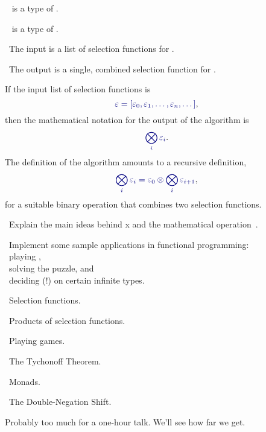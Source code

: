 \documentclass%
[%
Screen4to3,
]{foils}
\begin{document}
\vfill

~ is a type of .

~ is a type of .

~The input is a list of selection functions for .

  
~The output is a single, combined selection function for \darkblue{$[\mathtt{x}]$}.



If the
input list of selection functions is
\[
\darkblue{\varepsilon = [\varepsilon_0,\varepsilon_1,\dots,\varepsilon_n,\dots]},
\]
then the mathematical notation for the output of the algorithm is 
\[
\darkblue{\bigotimes_i \varepsilon_i}.
\]
The definition of the algorithm amounts to a recursive definition,
\[
\darkblue{\bigotimes_i \varepsilon_i = \varepsilon_0 \otimes \bigotimes_i
\varepsilon_{i+1}},
\]
for a suitable binary operation \darkblue{$\otimes$} that combines two selection
functions. 


\vfill

~Explain the main ideas behind x and
the mathematical operation~\darkblue{$\bigotimes$}.

\vfill

~Implement some sample applications in functional
programming:
\\[2ex] \qquad{}~playing ,
\\[2ex] \qquad{}~solving the  puzzle, and 
\\[2ex] \qquad{}~deciding  (!)
on certain infinite types.


~Selection functions. 

~Products of selection functions. 

~Playing games. 

~The Tychonoff Theorem. 

~Monads. 

~The Double-Negation Shift. 

\vfill

Probably too much for a one-hour talk. We'll see how far we get.
\end{document}
